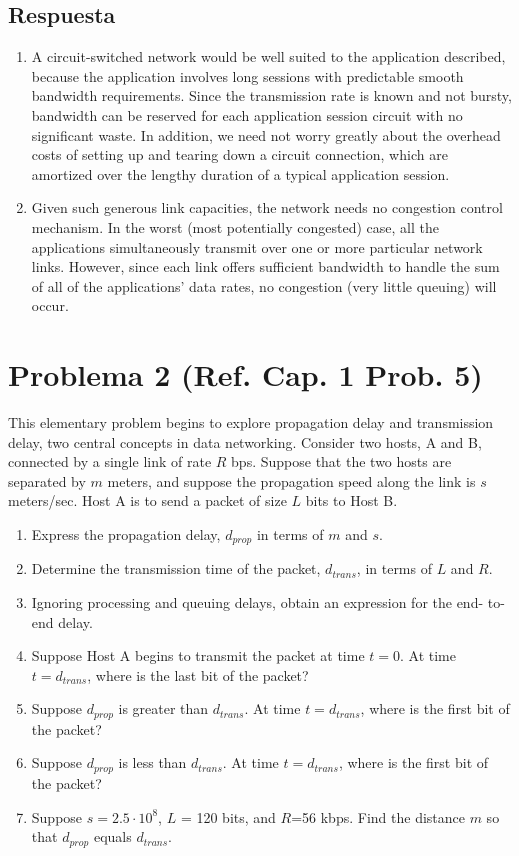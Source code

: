 \documentclass[10pt,spanish]{article}
\numberwithin{figure}{section} %
\begin{document}
\subsection*{Respuesta}

\begin{enumerate}
\item A circuit-switched network would be well suited to the application described, because the application involves long sessions with predictable smooth bandwidth requirements. Since the transmission rate is known and not bursty, bandwidth can be reserved for each application session circuit with no significant waste. In addition, we need not worry greatly about the overhead costs of setting up and tearing down a circuit connection, which are amortized over the lengthy duration of a typical application session.

\item Given such generous link capacities, the network needs no congestion control mechanism. In the worst (most potentially congested) case, all the applications simultaneously transmit over one or more particular network links. However, since each link offers sufficient bandwidth to handle the sum of all of the applications' data rates, no congestion (very little queuing) will occur.
\end{enumerate}

\section[Problema 2]{Problema 2 \textnormal{\Large{(Ref. Cap. 1 Prob. 5)}}}
This elementary problem begins to explore propagation delay and transmission delay, two central concepts in data networking. Consider two hosts, A and B, connected by a single link of rate $R$ bps. Suppose that the two hosts are separated by $m$ meters, and suppose the propagation speed along the link is $s$ meters/sec. Host A is to send a packet of size $L$ bits to Host B.
\begin{enumerate}
\item Express the propagation delay, $d_{prop}$  in terms of $m$ and $s$.
\item Determine the transmission time of the packet, $d_{trans}$, in terms of $L$ and $R$.
\item Ignoring processing and queuing delays, obtain an expression for the end- to-end delay.
\item Suppose Host A begins to transmit the packet at time $t = 0$. At time $t = d_{trans}$, where is the last bit of the packet?
\item Suppose $d_{prop}$ is greater than $d_{trans}$. At time $ t= d_{trans}$, where is the first bit of the packet?
\item Suppose $d_{prop}$ is less than $d_{trans}$. At time $t = d_{trans}$, where is the first bit of the packet?
\item Suppose $s = 2.5 \cdot 10^8$, $L$ = 120 bits, and $R$=56 kbps. Find the distance $m$ so that $d_{prop}$ equals $d_{trans}$.
\end{enumerate}
\end{document}
